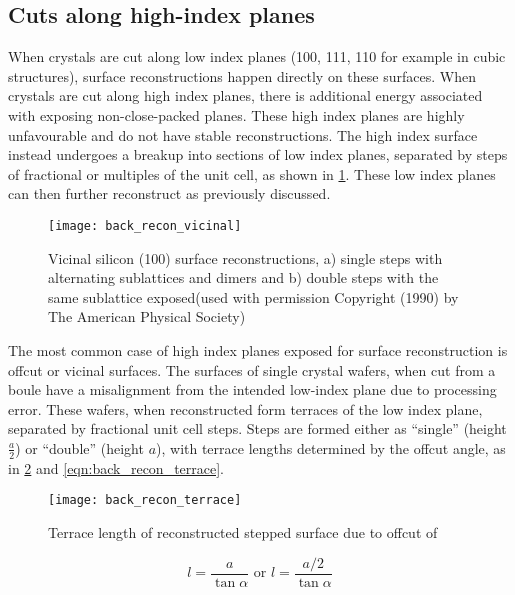 \subsection{Cuts along high-index planes}
When crystals are cut along low index planes (100, 111, 110 for example in cubic structures), surface reconstructions happen directly on these surfaces. When crystals are cut along high index planes, there is additional energy associated with exposing non-close-packed planes. These high index planes are highly unfavourable and do not have stable reconstructions. The high index surface instead undergoes a breakup into sections of low index planes, separated by steps of fractional or multiples of the unit cell, as shown in \cref{fig:back_recon_vicinal}. These low index planes can then further reconstruct as previously discussed.
\begin{figure}
    \centering
    \texttt{[image: back\_recon\_vicinal]}
    \caption[Silicon single an double step surface reconstructions]{\label{fig:back_recon_vicinal}Vicinal silicon (100) surface reconstructions, a) single steps with alternating sublattices and dimers and b) double steps with the same sublattice exposed\cite{Alerhand1990}(used with permission Copyright (1990) by The American Physical Society)}
\end{figure}

The most common case of high index planes exposed for surface reconstruction is offcut or vicinal surfaces. The surfaces of single crystal wafers, when cut from a boule have a misalignment from the intended low-index plane due to processing error. These wafers, when reconstructed form terraces of the low index plane, separated by fractional unit cell steps. Steps are formed either as ``single'' (height $\frac{a}{2}$) or ``double'' (height $a$), with terrace lengths determined by the offcut angle, as in \cref{fig:back_recon_terrace} and \cref{eqn:back_recon_terrace}.
\begin{figure}
    \centering
    \texttt{[image: back\_recon\_terrace]}
    \caption{\label{fig:back_recon_terrace}Terrace length of reconstructed stepped surface due to offcut of \textalpha}
\end{figure}
\begin{equation}
l = \frac{a}{\tan{\alpha}} \text{ or } l = \frac{a/2}{\tan{\alpha}} \label{eqn:back_recon_terrace}
\end{equation}

